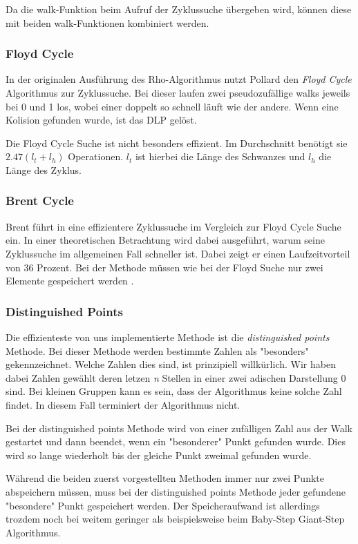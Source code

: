 \documentclass{scrartcl}
\begin{document}
Da die walk-Funktion beim Aufruf der Zyklussuche übergeben wird, können diese mit beiden walk-Funktionen kombiniert werden.

\subsubsection{Floyd Cycle}
\label{sec:floyd_cycle}
In der originalen Ausführung des Rho-Algorithmus nutzt Pollard
den \emph{Floyd Cycle} Algorithmus zur Zyklussuche.
Bei dieser laufen zwei pseudozufällige walks jeweils bei 0 und 1 los,
wobei einer doppelt so schnell läuft wie der andere.
Wenn eine Kolision gefunden wurde, ist das DLP gelöst.

Die Floyd Cycle Suche ist nicht besonders effizient.
Im Durchschnitt benötigt sie \( 2.47(l_t + l_h) \) Operationen.
\( l_t \) ist hierbei die Länge des Schwanzes und \( l_h \) die
Länge des Zyklus.
\cite{Galbraith2012}
\subsubsection{Brent Cycle}
\label{sec:brent_cycle}
Brent führt in \cite{Brent1980}  eine effizientere Zyklussuche im Vergleich zur Floyd Cycle Suche ein. In einer theoretischen Betrachtung wird dabei ausgeführt, warum seine Zyklussuche im allgemeinen Fall schneller ist.
Dabei zeigt er einen Laufzeitvorteil von 36 Prozent.
Bei der Methode müssen wie bei der Floyd Suche nur zwei Elemente gespeichert werden \cite{Galbraith2012}.
\subsubsection{Distinguished Points}
\label{sec:distinguished_points}
Die effizienteste von uns implementierte Methode ist die
\emph{distinguished points} Methode.
Bei dieser Methode werden bestimmte Zahlen als "besonders" gekennzeichnet.
Welche Zahlen dies sind, ist prinzipiell willkürlich.
Wir haben dabei Zahlen gewählt deren letzen \emph{n} Stellen in einer
zwei adischen Darstellung 0 sind.
Bei kleinen Gruppen kann es sein, dass der Algorithmus keine solche Zahl findet. 
In diesem Fall terminiert der Algorithmus nicht.

Bei der distinguished points Methode wird von einer zufälligen Zahl aus
der Walk gestartet und dann beendet, wenn ein "besonderer" Punkt
gefunden wurde.
Dies wird so lange wiederholt bis der gleiche Punkt zweimal gefunden wurde.

Während die beiden zuerst vorgestellten Methoden immer nur zwei Punkte abspeichern müssen,
muss bei der distinguished points Methode jeder gefundene "besondere" Punkt gespeichert werden.
Der Speicheraufwand ist allerdings trozdem noch bei weitem geringer als beispielsweise beim
Baby-Step Giant-Step Algorithmus.
\cite{VanOorschot1999}
\end{document}
